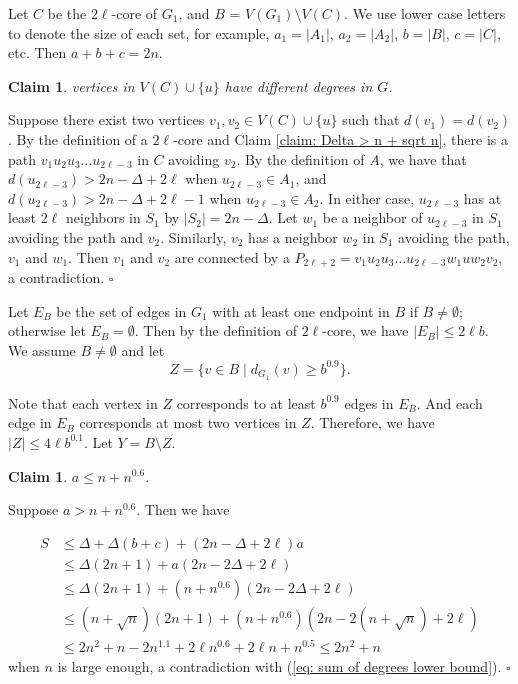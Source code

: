 \documentclass[12pt]{article}%
\newtheorem{claim}[theorem]{Claim}
\newenvironment{proof}{{\noindent\it Proof.}}{\hfill $\square$\par}
\begin{document}
Let $C$ be the $2\ell$-core of $G_1$, and $B$ = $V(G_1) \setminus  V(C)$.
We use lower case letters to denote the size of each set, for example, $a_1 = |A_1|$, $a_2 = |A_2|$, $b = |B|$, $c = |C|$, etc. Then $a+b+c=2n$.

\begin{claim}\label{claim: different degrees in C}
	vertices in $V(C)\cup \{u\}$ have different degrees in $G$.
\end{claim}

\begin{proof}
	Suppose there exist two vertices $v_1,v_2 \in V(C)\cup \{u\}$ such that $d(v_1)=d(v_2)$.
	By the definition of a $2\ell$-core and Claim \ref{claim: Delta > n + sqrt n}, there is a path $v_1u_2u_3\ldots u_{2\ell-3}$ in $C$ avoiding $v_2$.
	By the definition of $A$, we have that $d(u_{2\ell-3}) > 2n-\Delta+2\ell$ when $u_{2\ell -3} \in A_1$, and $d(u_{2\ell-3}) > 2n-\Delta+2\ell-1$ when $u_{2\ell -3} \in A_2$.
	In either case, $u_{2\ell-3}$ has at least $2\ell$ neighbors in $S_1$ by $|S_2| = 2n-\Delta$.
	Let $w_1$ be a neighbor of $u_{2\ell-3}$ in $S_1$ avoiding the path and $v_2$.
	Similarly, $v_2$ has a neighbor $w_2$ in $S_1$ avoiding the path, $v_1$ and $w_1$.
	Then $v_1$ and $v_2$ are connected by a $P_{2\ell+2}=v_1u_2u_3\ldots u_{2\ell-3}w_1u w_2v_2$, a contradiction.
\end{proof}


Let $E_B$ be the set of edges in $G_1$ with at least one endpoint in $B$ if $B\not=\emptyset$; otherwise let $E_B=\emptyset$.
Then by the definition of $2\ell$-core, we have $|E_B| \le 2\ell b$. We assume $B\not=\emptyset$ and
let
\begin{equation*}
	Z = \{ v \in B \mid d_{G_1}(v) \ge b^{0.9}\}.
\end{equation*}

Note that each vertex in $Z$ corresponds to at least $b^{0.9}$ edges in $E_B$.
And each edge in $E_B$ corresponds at most two vertices in $Z$.
Therefore, we have $|Z| \le 4\ell b^{0.1}$.
Let $Y = B \setminus Z$.



\begin{claim}\label{claim: upper bound of a}
	$a \le n+n^{0.6}$.
\end{claim}

\begin{proof}
	Suppose  $a > n+n^{0.6}$.
	Then we have

	\begin{equation*}
	\begin{aligned}
		S &\le \Delta + \Delta (b+c) + (2n-\Delta + 2\ell)a \\
		& \le \Delta(2n+1) + a(2n-2\Delta + 2\ell)\\
		& \le \Delta(2n+1) + (n+n^{0.6})(2n-2\Delta + 2\ell)\\
		& \le (n+\sqrt{n})(2n+1) + (n+n^{0.6})(2n-2(n+\sqrt{n}) + 2\ell)\\
		& \le 2 n^{2} + n - 2 n^{1.1} + 2 \ell n^{0.6} + 2 \ell n + n^{0.5}\le 2n^2 + n
	\end{aligned}
	\end{equation*}
	 when $n$ is large enough, a contradiction  with (\ref{eq: sum of degrees lower bound}).
\end{proof}
\end{document}
